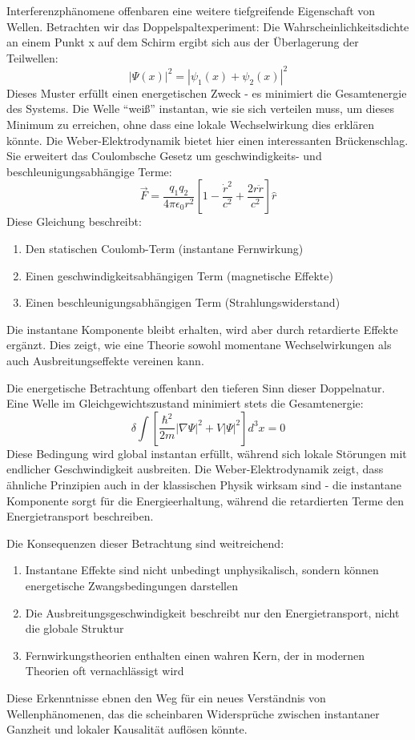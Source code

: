 Interferenzphänomene offenbaren eine weitere tiefgreifende Eigenschaft von Wellen. Betrachten wir das Doppelspaltexperiment: Die Wahrscheinlichkeitsdichte an einem Punkt x auf dem
Schirm ergibt sich aus der Überlagerung der Teilwellen:
\[
    |\Psi(x)|^2 = |\psi_1(x) + \psi_2(x)|^2
\]
Dieses Muster erfüllt einen energetischen Zweck - es minimiert die Gesamtenergie des Systems. Die Welle \enquote{weiß} instantan, wie sie sich verteilen muss, um dieses Minimum zu erreichen,
ohne dass eine lokale Wechselwirkung dies erklären könnte.
\newpage
Die Weber-Elektrodynamik bietet hier einen interessanten Brückenschlag. Sie erweitert das Coulombsche Gesetz um geschwindigkeits- und beschleunigungsabhängige Terme:
\begin{equation}
    \label{eq:weber_em}
    \vec{F} = \frac{q_1q_2}{4\pi\epsilon_0r^2}\left[1 - \frac{\dot{r}^2}{c^2} + \frac{2r\ddot{r}}{c^2}\right]\hat{r}
\end{equation}
Diese Gleichung beschreibt:
\begin{enumerate}
    \item Den statischen Coulomb-Term (instantane Fernwirkung)
    \item Einen geschwindigkeitsabhängigen Term (magnetische Effekte)
    \item Einen beschleunigungsabhängigen Term (Strahlungswiderstand)
\end{enumerate}
Die instantane Komponente bleibt erhalten, wird aber durch retardierte Effekte ergänzt. Dies zeigt, wie eine Theorie sowohl momentane Wechselwirkungen als auch Ausbreitungseffekte vereinen kann.

Die energetische Betrachtung offenbart den tieferen Sinn dieser Doppelnatur. Eine Welle im Gleichgewichtszustand minimiert stets die Gesamtenergie:
\[
    \delta \int \left[\frac{\hbar^2}{2m}|\nabla\Psi|^2 + V|\Psi|^2\right] d^3x = 0
\]
Diese Bedingung wird global instantan erfüllt, während sich lokale Störungen mit endlicher Geschwindigkeit ausbreiten. Die Weber-Elektrodynamik zeigt, dass ähnliche Prinzipien auch in der
klassischen Physik wirksam sind - die instantane Komponente sorgt für die Energieerhaltung, während die retardierten Terme den Energietransport beschreiben.

Die Konsequenzen dieser Betrachtung sind weitreichend:
\begin{enumerate}
    \item Instantane Effekte sind nicht unbedingt unphysikalisch, sondern können energetische Zwangsbedingungen darstellen
    \item Die Ausbreitungsgeschwindigkeit beschreibt nur den Energietransport, nicht die globale Struktur
    \item Fernwirkungstheorien enthalten einen wahren Kern, der in modernen Theorien oft vernachlässigt wird
\end{enumerate}
Diese Erkenntnisse ebnen den Weg für ein neues Verständnis von Wellenphänomenen, das die scheinbaren Widersprüche zwischen instantaner Ganzheit und lokaler Kausalität auflösen könnte.

